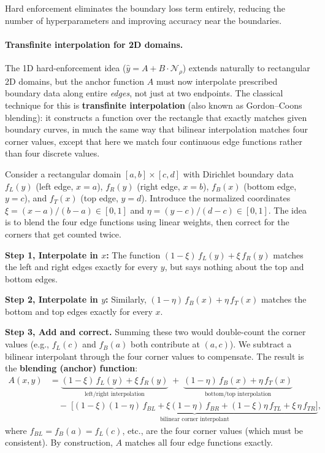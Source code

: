 \documentclass[11pt,a4paper]{report}
\newcommand{\emphc}[1]{\textcolor{harvardcrimson}{\textbf{#1}}}
\begin{document}
Hard enforcement eliminates the boundary loss term entirely, reducing the number of hyperparameters and improving accuracy near the boundaries.

\paragraph{Transfinite interpolation for 2D domains.}
The 1D hard-enforcement idea ($\hat{y} = A + B \cdot \mathcal{N}_\rho$) extends naturally to rectangular 2D domains, but the anchor function $A$ must now interpolate prescribed boundary data along entire \emph{edges}, not just at two endpoints.  The classical technique for this is \emphc{transfinite interpolation} (also known as Gordon--Coons blending): it constructs a function over the rectangle that exactly matches given boundary curves, in much the same way that bilinear interpolation matches four corner values, except that here we match four continuous edge functions rather than four discrete values.

Consider a rectangular domain $[a,b] \times [c,d]$ with Dirichlet boundary data $f_L(y)$ (left edge, $x=a$), $f_R(y)$ (right edge, $x=b$), $f_B(x)$ (bottom edge, $y=c$), and $f_T(x)$ (top edge, $y=d$).  Introduce the normalized coordinates $\xi = (x-a)/(b-a) \in [0,1]$ and $\eta = (y-c)/(d-c) \in [0,1]$.  The idea is to blend the four edge functions using linear weights, then correct for the corners that get counted twice.

\smallskip\noindent\textbf{Step 1, Interpolate in $x$:}  The function $(1-\xi)\,f_L(y) + \xi\,f_R(y)$ matches the left and right edges exactly for every $y$, but says nothing about the top and bottom edges.

\smallskip\noindent\textbf{Step 2, Interpolate in $y$:}  Similarly, $(1-\eta)\,f_B(x) + \eta\,f_T(x)$ matches the bottom and top edges exactly for every $x$.

\smallskip\noindent\textbf{Step 3, Add and correct.}  Summing these two would double-count the corner values (e.g., $f_L(c)$ and $f_B(a)$ both contribute at $(a,c)$).  We subtract a bilinear interpolant through the four corner values to compensate.  The result is the \emphc{blending (anchor) function}:
\begin{equation}
\begin{split}
A(x,y) &= \underbrace{(1-\xi)\,f_L(y) + \xi\,f_R(y)}_{\text{left/right interpolation}}
       \;+\; \underbrace{(1-\eta)\,f_B(x) + \eta\,f_T(x)}_{\text{bottom/top interpolation}} \\[4pt]
       &\quad -\; \underbrace{\bigl[(1-\xi)(1-\eta)\,f_{BL} + \xi(1-\eta)\,f_{BR} + (1-\xi)\eta\,f_{TL} + \xi\,\eta\,f_{TR}\bigr]}_{\text{bilinear corner interpolant}},
\end{split}
\end{equation}
where $f_{BL} = f_B(a) = f_L(c)$, etc., are the four corner values (which must be consistent).  By construction, $A$ matches all four edge functions exactly.
\end{document}

